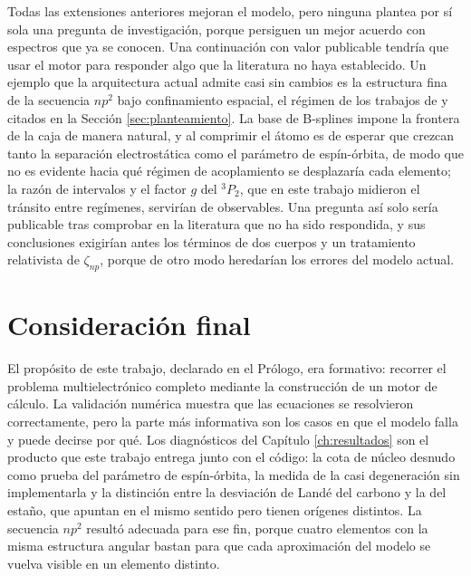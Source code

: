 Todas las extensiones anteriores mejoran el modelo, pero ninguna plantea por sí sola una pregunta de investigación, porque persiguen un mejor acuerdo con espectros que ya se conocen. Una continuación con valor publicable tendría que usar el motor para responder algo que la literatura no haya establecido. Un ejemplo que la arquitectura actual admite casi sin cambios es la estructura fina de la secuencia $np^2$ bajo confinamiento espacial, el régimen de los trabajos de \textcite{Garza2012} y \textcite{TingYun2001} citados en la Sección \ref{sec:planteamiento}. La base de B-splines impone la frontera de la caja de manera natural, y al comprimir el átomo es de esperar que crezcan tanto la separación electrostática como el parámetro de espín-órbita, de modo que no es evidente hacia qué régimen de acoplamiento se desplazaría cada elemento; la razón de intervalos y el factor $g$ del $^3P_2$, que en este trabajo midieron el tránsito entre regímenes, servirían de observables. Una pregunta así solo sería publicable tras comprobar en la literatura que no ha sido respondida, y sus conclusiones exigirían antes los términos de dos cuerpos y un tratamiento relativista de $\zeta_{np}$, porque de otro modo heredarían los errores del modelo actual.

\section{Consideración final}

El propósito de este trabajo, declarado en el Prólogo, era formativo: recorrer el problema multielectrónico completo mediante la construcción de un motor de cálculo. La validación numérica muestra que las ecuaciones se resolvieron correctamente, pero la parte más informativa son los casos en que el modelo falla y puede decirse por qué. Los diagnósticos del Capítulo \ref{ch:resultados} son el producto que este trabajo entrega junto con el código: la cota de núcleo desnudo como prueba del parámetro de espín-órbita, la medida de la casi degeneración sin implementarla y la distinción entre la desviación de Landé del carbono y la del estaño, que apuntan en el mismo sentido pero tienen orígenes distintos. La secuencia $np^2$ resultó adecuada para ese fin, porque cuatro elementos con la misma estructura angular bastan para que cada aproximación del modelo se vuelva visible en un elemento distinto.

